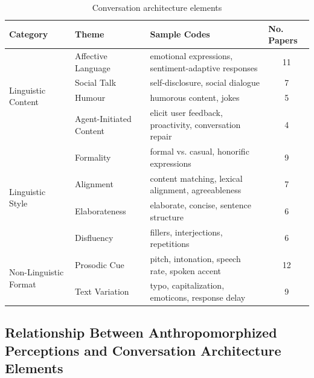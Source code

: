 \documentclass[sigconf,screen,review, anonymous]{acmart}
\begin{document}
\begin{table}[h]
\begin{tabular}{@{}lllc@{}}
\toprule
 \textbf{Category} & \textbf{Theme}      & \textbf{Sample Codes}                                      & \multicolumn{1}{l}{\textbf{No. Papers}} \\ \midrule
\multirow{4}{*}{Linguistic Content}    & Affective Language & emotional expressions, sentiment-adaptive responses & 11 \\
 & Social Talk           & self-disclosure, social dialogue                       & 7                                       \\
 & Humour                & humorous content, jokes                                & 5                                       \\
 & Agent-Initiated Content & elicit user feedback, proactivity, conversation repair & 4                                       \\ \midrule
\multirow{4}{*}{Linguistic Style}     & Formality          & formal vs. casual, honorific expressions                               & 9  \\
 & Alignment             & content matching, lexical alignment, agreeableness     & 7                                       \\
 & Elaborateness         & elaborate, concise, sentence structure                 & 6                                       \\
 & Disfluency            & fillers, interjections, repetitions                    & 6                                       \\ \midrule
\multirow{2}{*}{Non-Linguistic Format}     & Prosodic Cue            & pitch, intonation, speech rate, spoken accent                          & 12 \\
 & Text Variation        & typo, capitalization, emoticons, response delay & 9                                         \\ \bottomrule 
\end{tabular}%
\caption{Conversation architecture elements}
\label{tab:cues}
\end{table}

\subsection{Relationship Between Anthropomorphized Perceptions and Conversation Architecture Elements}
\end{document}
